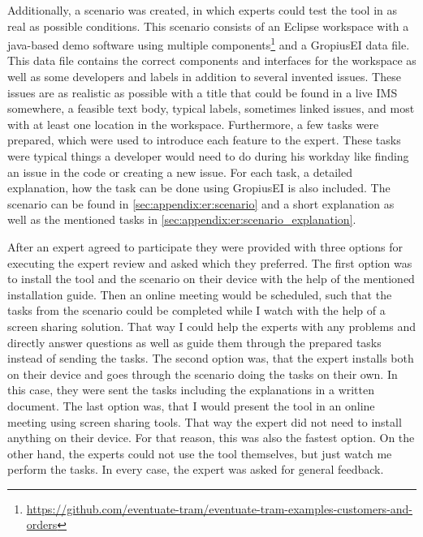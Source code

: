Additionally, a scenario was created, in which experts could test the tool in as real as possible conditions.
This scenario consists of an \gls{Eclipse} workspace with a java-based demo software using multiple components\footnote{\url{https://github.com/eventuate-tram/eventuate-tram-examples-customers-and-orders}} and a \gls{GropiusEI} data file.
This data file contains the correct components and interfaces for the workspace as well as some developers and labels in addition to
several invented issues.
These issues are as realistic as possible with a title that could be found in a live \gls{IMS} somewhere, a feasible text body,
typical labels, sometimes linked issues, and most with at least one location in the workspace.
Furthermore, a few tasks were prepared, which were used to introduce each feature to the expert.
These tasks were typical things a developer would need to do during his workday like finding an issue in the code or creating a new issue.
For each task, a detailed explanation, how the task can be done using \gls{GropiusEI} is also included. 
The scenario can be found in \cref{sec:appendix:er:scenario} and a short explanation as well as the mentioned tasks in \cref{sec:appendix:er:scenario_explanation}.

After an expert agreed to participate they were provided with three options for executing the expert review and asked which they preferred.
The first option was to install the tool and the scenario on their device with the help of the mentioned installation guide.
Then an online meeting would be scheduled, such that the tasks from the scenario could be completed while I watch with the help of a screen sharing solution. That way I could help the experts with any problems and directly answer questions as well as guide them through the prepared tasks instead of sending the tasks.
The second option was, that the expert installs both on their device and goes through the scenario doing the tasks on their own.
In this case, they were sent the tasks including the explanations in a written document.
The last option was, that I would present the tool in an online meeting using screen sharing tools. 
That way the expert did not need to install anything on their device. 
For that reason, this was also the fastest option. 
On the other hand, the experts could not use the tool themselves, but just watch me perform the tasks.
In every case, the expert was asked for general feedback.

